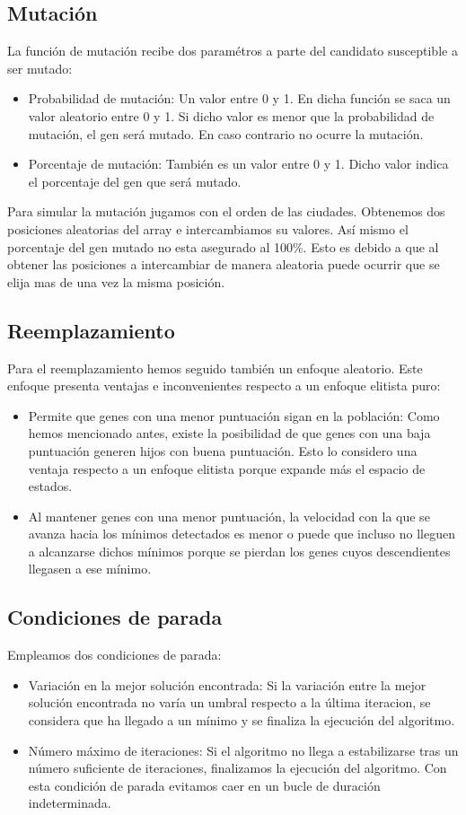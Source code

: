 \documentclass{article}
\begin{document}
\subsection{Mutación}
La función de mutación recibe dos paramétros a parte del candidato susceptible a ser mutado:
\begin{itemize}
    \item Probabilidad de mutación: Un valor entre 0 y 1. En dicha función se saca un valor aleatorio entre 0 y 1. Si dicho valor 
    es menor que la probabilidad de mutación, el gen será mutado. En caso contrario no ocurre la mutación. 
    \item Porcentaje de mutación: También es un valor entre 0 y 1. Dicho valor indica el porcentaje del gen que será mutado. 
\end{itemize}
    Para simular la mutación jugamos con el orden de las ciudades. Obtenemos dos posiciones aleatorias del array e intercambiamos 
    su valores. Así mismo el porcentaje del gen mutado no esta asegurado al 100\%. Esto es debido a que al obtener las posiciones 
    a intercambiar de manera aleatoria puede ocurrir que se elija mas de una vez la misma posición. 

\subsection{Reemplazamiento}
    Para el reemplazamiento hemos seguido también un enfoque aleatorio. Este enfoque presenta ventajas e inconvenientes 
    respecto a un enfoque elitista puro:
    \begin{itemize}
        \item Permite que genes con una menor puntuación sigan en la población: Como hemos mencionado antes, existe la 
        posibilidad de que genes con una baja puntuación generen hijos con buena puntuación. Esto lo considero una ventaja 
        respecto a un enfoque elitista porque expande más el espacio de estados.  
        \item Al mantener genes con una menor puntuación, la velocidad con la que se avanza hacia los mínimos detectados es 
        menor o puede que incluso no lleguen a alcanzarse dichos mínimos porque se pierdan los genes cuyos descendientes 
        llegasen a ese mínimo. 
    \end{itemize}    
\subsection{Condiciones de parada}
Empleamos dos condiciones de parada:
\begin{itemize}
    \item Variación en la mejor solución encontrada: Si la variación entre la mejor solución encontrada no varía un umbral
    respecto a la última iteracion, se considera que ha llegado a un mínimo y se finaliza la ejecución del algoritmo.
    \item Número máximo de iteraciones: Si el algoritmo no llega a estabilizarse tras un número suficiente de iteraciones, 
    finalizamos la ejecución del algoritmo. Con esta condición de parada evitamos caer en un bucle de duración indeterminada. 
\end{itemize}
\end{document}
